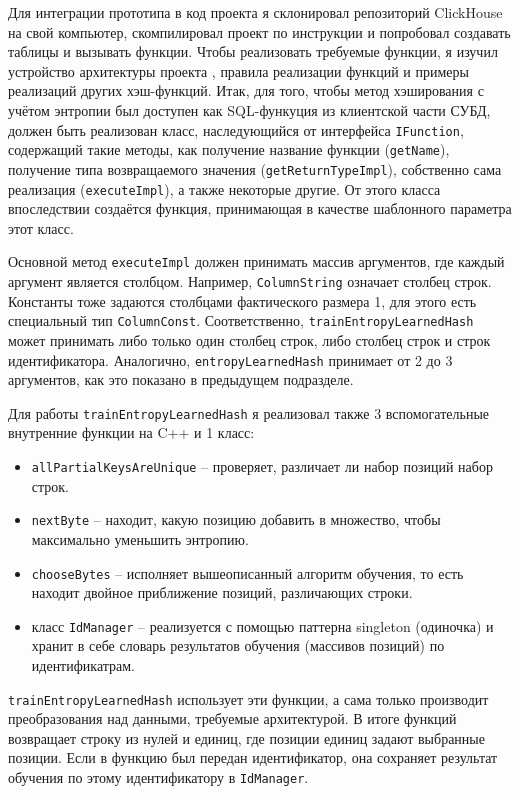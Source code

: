 \documentclass[a4paper,12pt]{extarticle}
\begin{document}
\begin{sloppypar}
Для интеграции прототипа в код проекта я склонировал репозиторий ClickHouse на свой компьютер, скомпилировал проект по инструкции \cite{clickhouse_build_instruction} и попробовал создавать таблицы и вызывать функции. Чтобы реализовать требуемые функции, я изучил устройство архитектуры проекта \cite{clickhouse_architecture}, правила реализации функций \cite{clickhouse_reqular_functions} и примеры реализаций других хэш-функций. 
Итак, для того, чтобы метод хэширования с учётом энтропии был доступен как SQL-функуция из клиентской части СУБД, должен быть реализован класс, наследующийся от интерфейса \texttt{IFunction}, содержащий такие методы, как получение название функции (\texttt{getName}), получение типа возвращаемого значения (\texttt{getReturnTypeImpl}), собственно сама реализация (\texttt{executeImpl}), а также некоторые другие. От этого класса впоследствии создаётся функция, принимающая в качестве шаблонного параметра этот класс.

Основной метод \texttt{executeImpl} должен принимать массив аргументов, где каждый аргумент является столбцом. Например, \texttt{ColumnString} означает столбец строк. Константы тоже задаются столбцами фактического размера 1, для этого есть специальный тип \texttt{ColumnConst}. Соответственно, \texttt{trainEntropyLearnedHash} может принимать либо только один столбец строк, либо столбец строк и строк идентификатора. Аналогично, \texttt{entropyLearnedHash} принимает от 2 до 3 аргументов, как это показано в предыдущем подразделе.

Для работы \texttt{trainEntropyLearnedHash} я реализовал также 3 вспомогательные внутренние функции на C++ и 1 класс: 
\begin{itemize}
	\item \texttt{allPartialKeysAreUnique} -- проверяет, различает ли набор позиций набор строк.
	\item \texttt{nextByte} -- находит, какую позицию добавить в множество, чтобы максимально уменьшить энтропию.
	\item \texttt{chooseBytes} -- исполняет вышеописанный алгоритм обучения, то есть находит двойное приближение позиций, различающих строки.
	\item класс \texttt{IdManager} -- реализуется с помощью паттерна singleton (одиночка) и хранит в себе словарь результатов обучения (массивов позиций) по идентификатрам.
\end{itemize}

\texttt{trainEntropyLearnedHash} использует эти функции, а сама только производит преобразования над данными, требуемые архитектурой. В итоге функций возвращает строку из нулей и единиц, где позиции единиц задают выбранные позиции. Если в функцию был передан идентификатор, она сохраняет результат обучения по этому идентификатору в \texttt{IdManager}.


\end{sloppypar}
\end{document}
